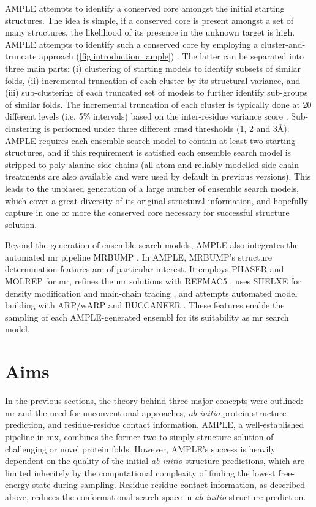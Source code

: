 AMPLE attempts to identify a conserved core amongst the initial starting structures. The idea is simple, if a conserved core is present amongst a set of many structures, the likelihood of its presence in the unknown target is high. AMPLE attempts to identify such a conserved core by employing a cluster-and-truncate approach (\cref{fig:introduction_ample}) \cite{Bibby2012-lm}. The latter can be separated into three main parts: (i) clustering of starting models to identify subsets of similar folds, (ii) incremental truncation of each cluster by its structural variance, and (iii) sub-clustering of each truncated set of models to further identify sub-groups of similar folds. The incremental truncation of each cluster is typically done at 20 different levels (i.e. 5\% intervals) based on the inter-residue variance score \cite{Theobald2006-qj}. Sub-clustering is performed under three different \gls{rmsd} thresholds (1, 2 and 3\AA). AMPLE requires each ensemble search model to contain at least two starting structures, and if this requirement is satisfied each ensemble search model is stripped to poly-alanine side-chains (all-atom and reliably-modelled side-chain \cite{Krivov2009-ex} treatments are also available and were used by default in previous versions). This leads to the unbiased generation of a large number of ensemble search models, which cover a great diversity of its original structural information, and hopefully capture in one or more the conserved core necessary for successful structure solution. 

Beyond the generation of ensemble search models, AMPLE also integrates the automated \gls{mr} pipeline MRBUMP \cite{Keegan2018-kn}. In AMPLE, MRBUMP's structure determination features are of particular interest. It employs PHASER \cite{McCoy2007-mp} and MOLREP \cite{Vagin2010-ux} for \gls{mr}, refines the \gls{mr} solutions with REFMAC5 \cite{Murshudov2011-ww}, uses SHELXE for density modification and main-chain tracing \cite{Thorn2013-le}, and attempts automated model building with ARP/wARP \cite{Cohen2007-wg} and BUCCANEER \cite{Cowtan2006-xv}. These features enable the sampling of each AMPLE-generated ensembl for its suitability as \gls{mr} search model.

%
%

\section{Aims}
In the previous sections, the theory behind three major concepts were outlined: \acrlong{mr} and the need for unconventional approaches, \textit{ab initio} protein structure prediction, and residue-residue contact information. AMPLE, a well-established pipeline in \gls{mx}, combines the former two to simply structure solution of challenging or novel protein folds. However, AMPLE's success is heavily dependent on the quality of the initial \textit{ab initio} structure predictions, which are limited inheritely by the computational complexity of finding the lowest free-energy state during sampling. Residue-residue contact information, as described above, reduces the conformational search space in \textit{ab initio} structure prediction.

